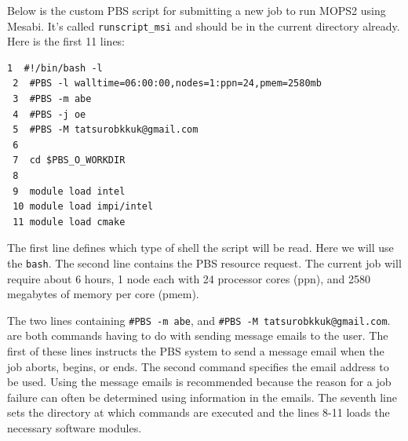 \documentclass[a4paper]{article}
\def\noin{\noindent }
\begin{document}
Below is the custom PBS script for submitting a new job to run MOPS2 using Mesabi. It's called \verb|runscript_msi| and should be in the current directory already. Here is the first 11 lines:

\lstset{language=sh} 
\begin{lstlisting}[frame=single,basicstyle=\scriptsize]
 1  #!/bin/bash -l
 2  #PBS -l walltime=06:00:00,nodes=1:ppn=24,pmem=2580mb
 3  #PBS -m abe
 4  #PBS -j oe
 5  #PBS -M tatsurobkkuk@gmail.com
 6
 7  cd $PBS_O_WORKDIR
 8
 9  module load intel
 10 module load impi/intel
 11 module load cmake
 \end{lstlisting}

\noin The first line defines which type of shell the script will be read. Here we will use the \verb|bash|. The second line contains the PBS resource request. The current job will require about 6 hours, 1 node each with 24 processor cores (ppn), and 2580 megabytes of memory per core (pmem). 

The two lines containing \verb|#PBS -m abe|, and \verb|#PBS -M tatsurobkkuk@gmail.com|. are both commands having to do with sending message emails to the user.  The first of these lines instructs the PBS system to send a message email when the job aborts, begins, or ends. The second command specifies the email address to be used.  Using the message emails is recommended because the reason for a job failure can often be determined using information in the emails. The seventh line sets the directory at which commands are executed and the lines 8-11 loads the necessary software modules. 
\end{document}
